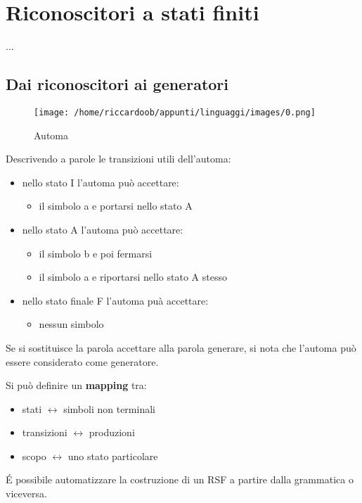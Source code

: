 \chapter{Riconoscitori a stati finiti}
...
\section{Dai riconoscitori ai generatori}
\begin{figure}[H]
    \caption{Automa}
    \centering
    \texttt{[image: /home/riccardoob/appunti/linguaggi/images/0.png]}
\end{figure}
Descrivendo a parole le transizioni utili dell'automa:
\begin{itemize}
    \item nello stato I l'automa può accettare:
    \begin{itemize}
        \item il simbolo a e portarsi nello stato A
    \end{itemize}
    \item nello stato A l'automa può accettare:
    \begin{itemize}
        \item il simbolo b e poi fermarsi
        \item il simbolo a e riportarsi nello stato A stesso
    \end{itemize}
    \item nello stato finale F l'automa puà accettare:
    \begin{itemize}
        \item nessun simbolo
    \end{itemize}
\end{itemize}
\setlist{}

Se si sostituisce la parola accettare alla parola generare, si nota che l'automa può essere considerato come generatore.

Si può definire un \textbf{mapping} tra:
\begin{itemize}
    \item stati $\longleftrightarrow$ simboli non terminali
    \item transizioni $\longleftrightarrow$ produzioni
    \item scopo $\longleftrightarrow$ uno stato particolare
\end{itemize}

É possibile automatizzare la costruzione di un RSF a partire dalla grammatica o viceversa.

